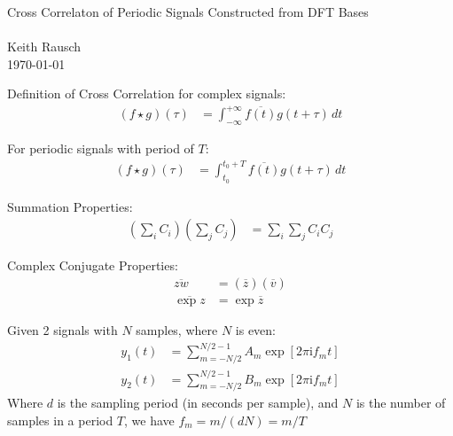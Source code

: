 \documentclass[12pt]{article}
\newenvironment{given}[1][Given]{\begin{trivlist}
\item[\hskip \labelsep {\bfseries #1:}\hskip \labelsep ]}{\end{trivlist}}
\begin{document}
\hfill {\Large \center Cross Correlaton of Periodic Signals Constructed from DFT Bases} \\
\\
\noindent Keith Rausch \\
\hfill \today \\

\newcommand\twopi{2 \pi}
\newcommand\twopii{\twopi \mathrm{i}}
\newcommand\pii{\pi \mathrm{i}}

\begin{given}{} 
Definition of Cross Correlation for complex signals:
\begin{align}
(f \star g)(\tau) & = \int_{-\infty}^{+\infty} \overline{f(t)} g(t+\tau) \,dt
\end{align}

For periodic signals with period of $T$:
\begin{align}
(f \star g)(\tau) & = \int_{t_0}^{t_0+T} \overline{f(t)} g(t+\tau) \,dt
\end{align}

Summation Properties:
\begin{align}
\left( \sum_{i} C_i \right) \left( \sum_{j} C_j \right) & = \sum_{i} \sum_{j} C_i C_j
\end{align}

Complex Conjugate Properties:
\begin{align}
\overline{zw} & = (\overline{z}) (\overline{v}) \\
\overline{ \exp{z}} & = \exp{\overline{z}}
\end{align}

Given 2 signals with $N$ samples, where $N$ is even:
\begin{align}
y_1(t) & = \sum_{m = -N/2}^{N/2-1} A_m \exp{[\twopii f_m t]} \\
y_2(t) & = \sum_{m = -N/2}^{N/2-1} B_m \exp{[\twopii f_m t]}
\end{align}
Where $d$ is the sampling period (in seconds per sample), and $N$ is the number of samples in a period $T$, we have $f_m = m/(dN) = m/T$
\end{given}


\end{document}
